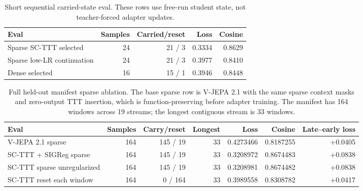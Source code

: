 \documentclass[10pt]{article}
\begin{document}
\begin{table}[t]
\centering
\caption{Short sequential carried-state eval.  These rows use free-run student
state, not teacher-forced adapter updates.}
\label{tab:coherence}
\begin{tabular}{lrrrr}
\toprule
Eval & Samples & Carried/reset & Loss & Cosine \\
\midrule
Sparse SC-TTT selected & 24 & 21 / 3 & 0.3334 & 0.8629 \\
Sparse low-LR continuation & 24 & 21 / 3 & 0.3977 & 0.8410 \\
Dense selected & 16 & 15 / 1 & 0.3946 & 0.8448 \\
\bottomrule
\end{tabular}
\end{table}

\begin{table}[t]
\centering
\scriptsize
\setlength{\tabcolsep}{3pt}
\caption{Full held-out manifest sparse ablation.  The base sparse row is
V-JEPA 2.1 with the same sparse context masks and zero-output TTT insertion,
which is function-preserving before adapter training.  The manifest has 164
windows across 19 streams; the longest contiguous stream is 33 windows.}
\label{tab:longitudinal}
\begin{tabular}{lrrrrrr}
\toprule
Eval & Samples & Carry/reset & Longest & Loss & Cosine & Late--early loss \\
\midrule
V-JEPA 2.1 sparse & 164 & 145 / 19 & 33 & 0.4273466 & 0.8187255 & +0.0405 \\
SC-TTT + SIGReg sparse & 164 & 145 / 19 & 33 & 0.3208972 & 0.8674483 & +0.0838 \\
SC-TTT sparse unregularized & 164 & 145 / 19 & 33 & 0.3208981 & 0.8674482 & +0.0838 \\
SC-TTT reset each window & 164 & 0 / 164 & 33 & 0.3989558 & 0.8308782 & +0.0417 \\
\bottomrule
\end{tabular}
\end{table}
\end{document}
